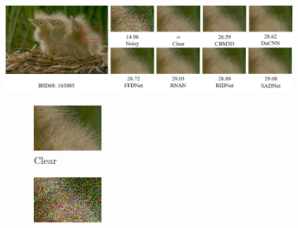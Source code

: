  \begin{figure}[t!]
    \centering
        \includegraphics[width=0.96\textwidth]{images/deneme.png}
        \begin{subfigure}{0.25\textwidth}
            \includegraphics[width=\linewidth]{images/bsd_gt.png}
            \caption{Clear}
            \label{fig:bsd_clear}
        \end{subfigure}\hfil %
        \begin{subfigure}{0.25\textwidth}
            \includegraphics[width=\linewidth]{images/bsd_noisy.png}

\end{subfigure}
\end{figure}
